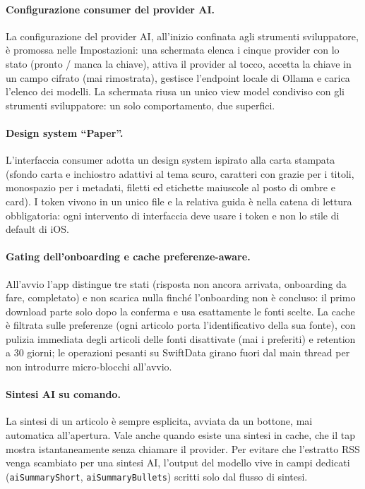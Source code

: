 \paragraph{Configurazione consumer del provider AI.}
\label{sec:settings-ai}
La configurazione del provider AI, all'inizio confinata agli strumenti
sviluppatore, è promossa nelle Impostazioni: una schermata elenca i
cinque provider con lo stato (pronto / manca la chiave), attiva il
provider al tocco, accetta la chiave in un campo cifrato (mai
rimostrata), gestisce l'endpoint locale di Ollama e carica l'elenco dei
modelli. La schermata riusa un unico view model condiviso con gli
strumenti sviluppatore: un solo comportamento, due superfici.

\paragraph{Design system ``Paper''.}
\label{sec:design-system}
L'interfaccia consumer adotta un design system ispirato alla carta
stampata (sfondo carta e inchiostro adattivi al tema scuro, caratteri
con grazie per i titoli, monospazio per i metadati, filetti ed etichette
maiuscole al posto di ombre e card). I token vivono in un unico file e
la relativa guida è nella catena di lettura obbligatoria: ogni intervento
di interfaccia deve usare i token e non lo stile di default di iOS.

\paragraph{Gating dell'onboarding e cache preferenze-aware.}
\label{sec:onboarding-cache}
All'avvio l'app distingue tre stati (risposta non ancora arrivata,
onboarding da fare, completato) e non scarica nulla finché l'onboarding
non è concluso: il primo download parte solo dopo la conferma e usa
esattamente le fonti scelte. La cache è filtrata sulle preferenze (ogni
articolo porta l'identificativo della sua fonte), con pulizia immediata
degli articoli delle fonti disattivate (mai i preferiti) e retention a
30 giorni; le operazioni pesanti su SwiftData girano fuori dal main
thread per non introdurre micro-blocchi all'avvio.

\paragraph{Sintesi AI su comando.}
\label{sec:summary-button-cache}
La sintesi di un articolo è sempre esplicita, avviata da un bottone, mai
automatica all'apertura. Vale anche quando esiste una sintesi in cache,
che il tap mostra istantaneamente senza chiamare il provider. Per evitare
che l'estratto RSS venga scambiato per una sintesi AI, l'output del
modello vive in campi dedicati (\texttt{aiSummaryShort},
\texttt{aiSummaryBullets}) scritti solo dal flusso di sintesi.

